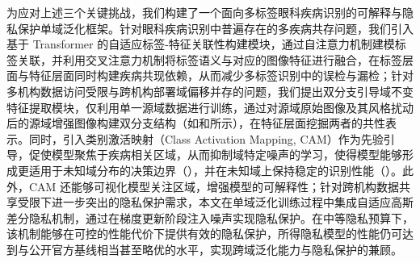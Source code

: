 为应对上述三个关键挑战，我们构建了一个面向多标签眼科疾病识别的可解释与隐私保护单域泛化框架。针对眼科疾病识别中普遍存在的多疾病共存问题，我们引入基于 Transformer 的自适应标签-特征关联性构建模块，通过自注意力机制建模标签关联，并利用交叉注意力机制将标签语义与对应的图像特征进行融合，在标签层面与特征层面同时构建疾病共现依赖，从而减少多标签识别中的误检与漏检；针对多机构数据访问受限与跨机构部署域偏移并存的问题，我们提出双分支引导域不变特征提取模块，仅利用单一源域数据进行训练，通过对源域原始图像及其风格扰动后的源域增强图像构建双分支结构（如和所示），在特征层面挖掘两者的共性表示。同时，引入类别激活映射（Class Activation Mapping, CAM）作为先验引导，促使模型聚焦于疾病相关区域，从而抑制域特定噪声的学习，使得模型能够形成更适用于未知域分布的决策边界（），并在未知域上保持稳定的识别性能（）。此外，CAM 还能够可视化模型关注区域，增强模型的可解释性；针对跨机构数据共享受限下进一步突出的隐私保护需求，本文在单域泛化训练过程中集成自适应高斯差分隐私机制，通过在梯度更新阶段注入噪声实现隐私保护。在中等隐私预算下，该机制能够在可控的性能代价下提供有效的隐私保护，所得隐私模型的性能仍可达到与公开官方基线相当甚至略优的水平，实现跨域泛化能力与隐私保护的兼顾。

